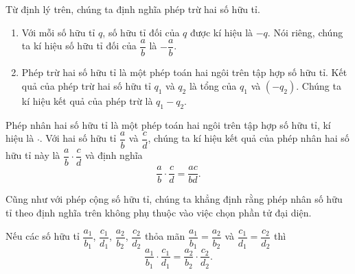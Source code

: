 Từ định lý trên, chúng ta định nghĩa phép trừ hai số hữu tỉ.
\begin{definition}
    \begin{enumerate}[label={(\roman*)}]
        \item Với mỗi số hữu tỉ $q$, số hữu tỉ đối của $q$ được kí hiệu là $-q$. Nói riêng, chúng ta kí hiệu số hữu tỉ đối của $\dfrac{a}{b}$ là $-\dfrac{a}{b}$.
        \item Phép trừ hai số hữu tỉ là một phép toán hai ngôi trên tập hợp số hữu tỉ. Kết quả của phép trừ hai số hữu tỉ $q_{1}$ và $q_{2}$ là tổng của $q_{1}$ và $(-q_{2})$. Chúng ta kí hiệu kết quả của phép trừ là $q_{1} - q_{2}$.
    \end{enumerate}
\end{definition}

\begin{definition}
    Phép nhân hai số hữu tỉ là một phép toán hai ngôi trên tập hợp số hữu tỉ, kí hiệu là $\cdot$. Với hai số hữu tỉ $\dfrac{a}{b}$ và $\dfrac{c}{d}$, chúng ta kí hiệu kết quả của phép nhân hai số hữu tỉ này là $\dfrac{a}{b}\cdot\dfrac{c}{d}$ và định nghĩa
    \[
        \frac{a}{b}\cdot\frac{c}{d} = \frac{ac}{bd}.
    \]
\end{definition}

Cũng như với phép cộng số hữu tỉ, chúng ta khẳng định rằng phép nhân số hữu tỉ theo định nghĩa trên không phụ thuộc vào việc chọn phần tử đại diện.
\begin{proposition}
    Nếu các số hữu tỉ $\dfrac{a_{1}}{b_{1}}$, $\dfrac{c_{1}}{d_{1}}$, $\dfrac{a_{2}}{b_{2}}$, $\dfrac{c_{2}}{d_{2}}$ thỏa mãn $\dfrac{a_{1}}{b_{1}} = \dfrac{a_{2}}{b_{2}}$ và $\dfrac{c_{1}}{d_{1}} = \dfrac{c_{2}}{d_{2}}$ thì
    \[
        \frac{a_{1}}{b_{1}}\cdot\frac{c_{1}}{d_{1}} = \frac{a_{2}}{b_{2}}\cdot\frac{c_{2}}{d_{2}}.
    \]
\end{proposition}

